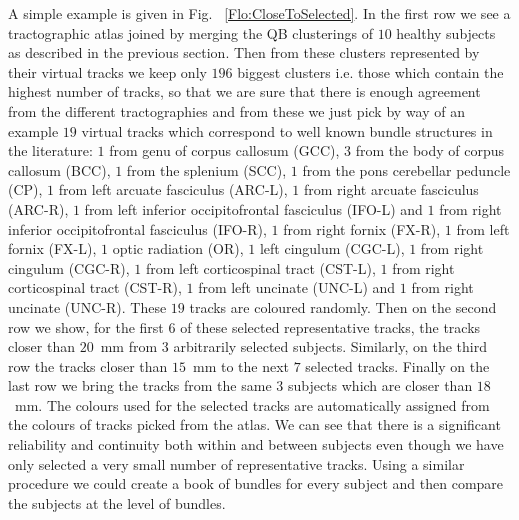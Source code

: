 \documentclass[preprint,authoryear,a4paper,10pt,onecolumn]{elsarticle}
\begin{document}
A simple example is given in Fig. ~\ref{Flo:CloseToSelected}. In the
first row we see a tractographic atlas joined by merging the QB
clusterings of $10$ healthy subjects as described in the previous
section. Then from these clusters represented by their virtual tracks we
keep only $196$ biggest clusters i.e. those which contain the highest
number of tracks, so that we are sure that there is enough agreement
from the different tractographies and from these we just pick by way of
an example $19$ virtual tracks which correspond to well known bundle
structures in the literature: $1$ from genu of corpus callosum (GCC),
$3$ from the body of corpus callosum (BCC), $1$ from the splenium (SCC),
$1$ from the pons cerebellar peduncle (CP), $1$ from left arcuate
fasciculus (ARC-L), $1$ from right arcuate fasciculus (ARC-R), $1$ from
left inferior occipitofrontal fasciculus (IFO-L) and $1$ from right
inferior occipitofrontal fasciculus (IFO-R), $1$ from right fornix
(FX-R), $1$ from left fornix (FX-L), $1$ optic radiation (OR), $1$ left
cingulum (CGC-L), $1$ from right cingulum (CGC-R), $1$ from left
corticospinal tract (CST-L), $1$ from right corticospinal tract (CST-R),
$1$ from left uncinate (UNC-L) and $1$ from right uncinate
(UNC-R). These $19$ tracks are coloured randomly. Then on the second row
we show, for the first $6$ of these selected representative tracks, the
tracks closer than $20$~mm from $3$ arbitrarily selected
subjects. Similarly, on the third row the tracks closer than $15$~mm to
the next $7$ selected tracks. Finally on the last row we bring the
tracks from the same $3$ subjects which are closer than $18$~mm.  The
colours used for the selected tracks are automatically assigned from the
colours of tracks picked from the atlas. We can see that there is a
significant reliability and continuity both within and between subjects
even though we have only selected a very small number of representative
tracks. Using a similar procedure we could create a book of bundles for
every subject and then compare the subjects at the level of bundles.
\end{document}
